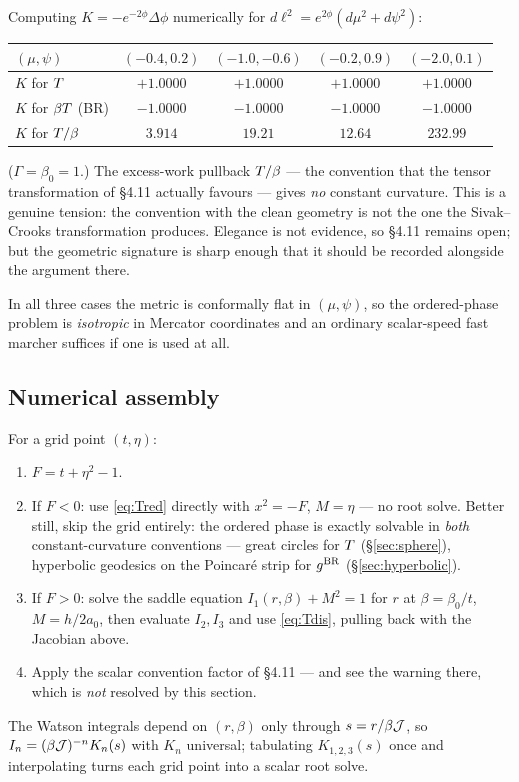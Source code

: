  Computing
$K=-e^{-2\phi}\Delta\phi$ numerically for $d\ell^{2}=e^{2\phi}(d\mu^{2}+d\psi^{2})$:
\begin{center}
\begin{tabular}{lcccc}
\hline
$(\mu,\psi)$ & $(-0.4,0.2)$ & $(-1.0,-0.6)$ & $(-0.2,0.9)$ & $(-2.0,0.1)$\\
\hline
$K$ for $T$            & $+1.0000$ & $+1.0000$ & $+1.0000$ & $+1.0000$\\
$K$ for $\beta T$ (BR)  & $-1.0000$ & $-1.0000$ & $-1.0000$ & $-1.0000$\\
$K$ for $T/\beta$      & $3.914$   & $19.21$   & $12.64$   & $232.99$\\
\hline
\end{tabular}
\end{center}
($\Gamma=\beta_0=1$.) The excess-work pullback $T/\beta$ --- the convention that the tensor
transformation of \S4.11 actually favours --- gives \emph{no} constant curvature. This is a
genuine tension: the convention with the clean geometry is not the one the Sivak--Crooks
transformation produces. Elegance is not evidence, so \S4.11 remains open; but the
geometric signature is sharp enough that it should be recorded alongside the argument
there.

In all three cases the metric is conformally flat in $(\mu,\psi)$, so the ordered-phase
problem is \emph{isotropic} in Mercator coordinates and an ordinary scalar-speed fast marcher
suffices if one is used at all.

\subsection{Numerical assembly}
For a grid point $(t,\eta)$:
\begin{enumerate}
  \item $F=t+\eta^{2}-1$.
  \item If $F<0$: use \eqref{eq:Tred} directly with $x^{2}=-F$, $M=\eta$ --- no root solve.
        Better still, skip the grid entirely: the ordered phase is exactly solvable in
        \emph{both} constant-curvature conventions --- great circles for $T$
        (\S\ref{sec:sphere}), hyperbolic geodesics on the Poincar\'e strip for $g^{\rm BR}$
        (\S\ref{sec:hyperbolic}).
  \item If $F>0$: solve the saddle equation $I_1(r,\beta)+M^{2}=1$ for $r$ at
        $\beta=\beta_0/t$, $M=h/2a_0$, then evaluate $I_2,I_3$ and use \eqref{eq:Tdis},
        pulling back with the Jacobian above.
  \item Apply the scalar convention factor of \S4.11 --- and see the warning there, which is
        \emph{not} resolved by this section.
\end{enumerate}
The Watson integrals depend on $(r,\beta)$ only through $s=r/\beta\mathcal{J}$, so
$I_n=(\beta\mathcal{J})^{-n}K_n(s)$ with $K_n$ universal; tabulating $K_{1,2,3}(s)$ once and
interpolating turns each grid point into a scalar root solve.


